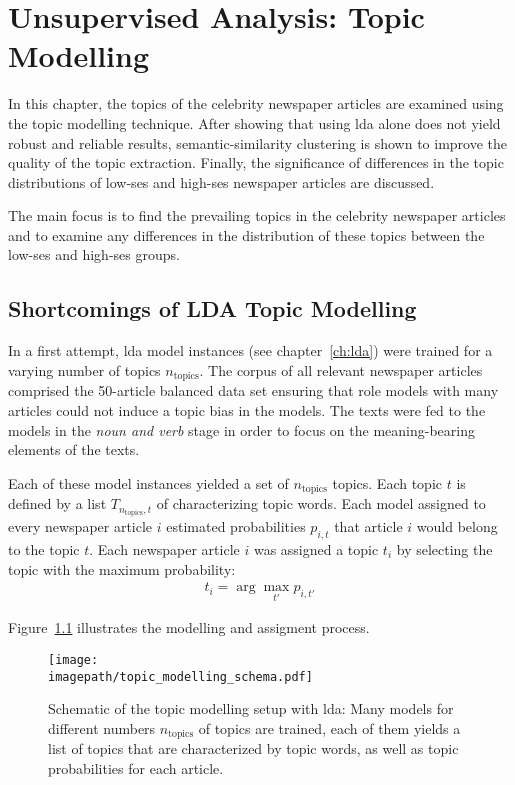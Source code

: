 \renewcommand{\imagepath}{../50-unsupervised/img}
\newcommand{\ntopics}{n_\text{topics}}
\newcommand{\nclusters}{n_\text{clusters}}

\chapter{Unsupervised Analysis: Topic Modelling}
In this chapter, the topics of the celebrity newspaper articles are examined using the topic modelling technique. After showing that using \gls{lda} alone does not yield robust and reliable results, semantic-similarity clustering is shown to improve the quality of the topic extraction.  Finally, the significance of differences in the topic distributions of low-\gls{ses} and high-\gls{ses} newspaper articles are discussed.

The main focus is to find the prevailing topics in the celebrity newspaper articles and to examine any differences in the distribution of these topics between the low-\gls{ses} and high-\gls{ses} groups.

\section{Shortcomings of LDA Topic Modelling}
In a first attempt, \gls{lda} model instances (see chapter~\ref{ch:lda}) were trained for a varying number of topics $\ntopics$. The corpus of all relevant newspaper articles comprised the 50-article balanced data set ensuring that role models with many articles could not induce a topic bias in the models. The texts were fed to the models in the \textit{noun and verb} stage in order to focus on the meaning-bearing elements of the texts.

Each of these model instances yielded a set of $\ntopics$ topics. Each topic $t$ is defined by a list $T_{\ntopics, t}$ of characterizing topic words. Each model assigned to every newspaper article $i$ estimated probabilities $p_{i, t}$ that article $i$ would belong to the topic $t$. Each newspaper article $i$ was assigned a topic $t_i$ by selecting the topic with the maximum probability:
\begin{align}
    t_i = \arg \max_{t'} p_{i, t'}
\end{align}

Figure~\ref{fig:topic_modelling_schema} illustrates the modelling and assigment process.
\begin{figure}
    \centering
    \texttt{[image: \\imagepath/topic\_modelling\_schema.pdf]}
    \caption{Schematic of the topic modelling setup with \gls{lda}: Many models for different numbers $\ntopics$ of topics are trained, each of them yields a list of topics that are characterized by topic words, as well as topic probabilities for each article.}\label{fig:topic_modelling_schema}
\end{figure}

